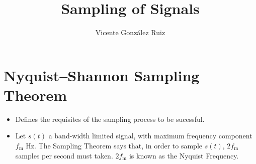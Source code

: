\title{Sampling of Signals}
\author{Vicente González Ruiz}
\maketitle
\tableofcontents

\section{Nyquist–Shannon Sampling Theorem~\cite{oppenheim2014discrete,lathi1998modern}}
\begin{itemize}
\item Defines the requisites of the sampling process to be sucessful.
\item Let $s(t)$ a band-width limited signal, with maximum frequency
  component $f_\text{m}$ Hz. The Sampling Theorem says that, in order
  to sample $s(t)$, $2f_\text{m}$ samples per second must taken.
  $2f_\text{m}$ is known as the Nyquist Frequency.
\end{itemize}


